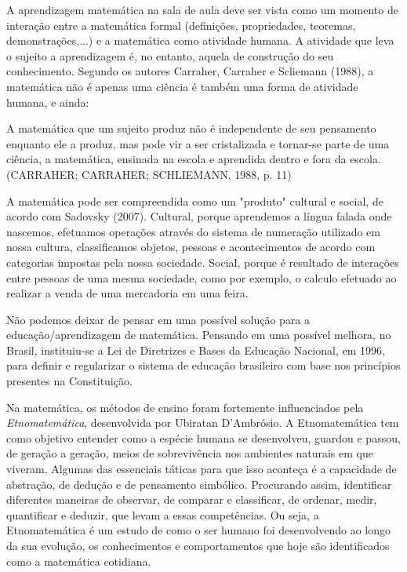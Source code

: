 \documentclass[brasil]{abnt}
\begin{document}
    A aprendizagem matemática na sala de aula deve ser vista como um momento de interação entre a matemática formal (definições, propriedades, teoremas, demonstrações,...) e a matemática como atividade humana. 
    A atividade que leva o sujeito a aprendizagem é, no entanto, aquela de construção do seu conhecimento. Segundo os autores Carraher, Carraher e Scliemann (1988), a matemática não é apenas uma ciência é 
    também uma forma de atividade humana, e ainda: 
    
		\begin{citacao}A matemática que um sujeito produz não é independente de seu pensamento enquanto ele a produz, mas pode vir a ser cristalizada e tornar-se parte de uma 
					ciência, a matemática, ensinada na escola e aprendida dentro e fora da escola. (CARRAHER; CARRAHER; SCHLIEMANN, 1988, p. 11)
		\end{citacao}
    
    A matemática pode ser compreendida como um "produto" cultural e social, de acordo com Sadovsky (2007). Cultural, porque aprendemos a língua falada onde nascemos, efetuamos operações 
    através do sistema de numeração utilizado em nossa cultura, classificamos objetos, pessoas e acontecimentos de acordo com categorias impostas pela nossa 
    sociedade. Social, porque é resultado de interações entre pessoas de uma mesma sociedade, como por exemplo, o calculo efetuado ao realizar a venda de uma 
    mercadoria em uma feira.
    
    Não podemos deixar de pensar em uma possível solução para a educação/aprendizagem de matemática. Pensando em uma possível melhora, no Brasil, instituiu-se a 
    Lei de Diretrizes e Bases da Educação Nacional, em 1996, para definir e regularizar o sistema de educação brasileiro com base nos princípios presentes na Constituição. 
    
    Na matemática, os métodos de ensino foram fortemente influenciados pela \textit{Etnomatemática}, desenvolvida 
    por Ubiratan D’Ambrósio. A Etnomatemática tem como objetivo entender como a espécie humana se desenvolveu, guardou e passou, de geração a geração, meios de sobrevivência nos ambientes naturais em que viveram. 
	Algumas das essenciais táticas para que isso aconteça é a capacidade de abstração, de dedução e de pensamento simbólico. Procurando assim, identificar diferentes maneiras de observar,
	de comparar e classificar, de ordenar, medir, quantificar e deduzir, que levam a essas competências. Ou seja, a Etnomatemática é um estudo de como o ser humano foi desenvolvendo ao longo da sua
	evolução, os conhecimentos e comportamentos que hoje são identificados como a matemática cotidiana.
			
\end{document}

